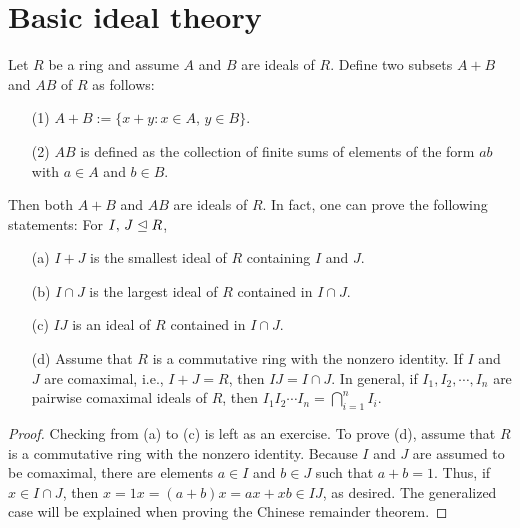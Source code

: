\section{Basic ideal theory}

\begin{prop}
    Let $R$ be a ring and assume $A$ and $B$ are ideals of $R$.
    Define two subsets $A+B$ and $AB$ of $R$ as follows:
    \begin{enumerate}
        \item[(1)]
        {
            $A+B:=\{x+y: x\in A,\,y\in B\}$.
        }
        \item[(2)]
        {
            $AB$ is defined as the collection of finite sums of elements of the form $ab$ with $a\in A$ and $b\in B$.
        }
    \end{enumerate}
    Then both $A+B$ and $AB$ are ideals of $R$.
    In fact, one can prove the following statements: For $I,\,J\trianglelefteq R$,
    \begin{enumerate}
        \item[(a)]
        {
            $I+J$ is the smallest ideal of $R$ containing $I$ and $J$.
        }
        \item[(b)]
        {
            $I\cap J$ is the largest ideal of $R$ contained in $I\cap J$.
        }
        \item[(c)]
        {
            $IJ$ is an ideal of $R$ contained in $I\cap J$.
        }
        \item[(d)]
        {
            Assume that $R$ is a commutative ring with the nonzero identity.
            If $I$ and $J$ are comaximal, i.e., $I+J=R$, then $IJ=I\cap J$.
            In general, if $I_1, I_2, \cdots, I_n$ are pairwise comaximal ideals of $R$, then $I_1I_2\cdots I_n=\bigcap_{i=1}^n I_i$.
        }
    \end{enumerate}
\end{prop}
\begin{proof}
    \color{brown}Checking from (a) to (c) is left as an exercise. \color{black}
    To prove (d), assume that $R$ is a commutative ring with the nonzero identity.
    Because $I$ and $J$ are assumed to be comaximal, there are elements $a\in I$ and $b\in J$ such that $a+b=1$.
    Thus, if $x\in I\cap J$, then $x=1x=(a+b)x=ax+xb\in IJ$, as desired.
    The generalized case will be explained when proving the Chinese remainder theorem.
\end{proof}

